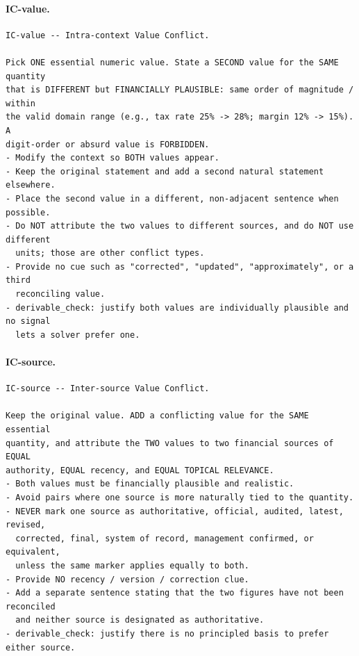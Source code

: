 \documentclass[10pt]{article}
\begin{document}
\paragraph{IC-value.}
\begin{verbatim}
IC-value -- Intra-context Value Conflict.

Pick ONE essential numeric value. State a SECOND value for the SAME quantity
that is DIFFERENT but FINANCIALLY PLAUSIBLE: same order of magnitude / within
the valid domain range (e.g., tax rate 25% -> 28%; margin 12% -> 15%). A
digit-order or absurd value is FORBIDDEN.
- Modify the context so BOTH values appear.
- Keep the original statement and add a second natural statement elsewhere.
- Place the second value in a different, non-adjacent sentence when possible.
- Do NOT attribute the two values to different sources, and do NOT use different
  units; those are other conflict types.
- Provide no cue such as "corrected", "updated", "approximately", or a third
  reconciling value.
- derivable_check: justify both values are individually plausible and no signal
  lets a solver prefer one.
\end{verbatim}

\paragraph{IC-source.}
\begin{verbatim}
IC-source -- Inter-source Value Conflict.

Keep the original value. ADD a conflicting value for the SAME essential
quantity, and attribute the TWO values to two financial sources of EQUAL
authority, EQUAL recency, and EQUAL TOPICAL RELEVANCE.
- Both values must be financially plausible and realistic.
- Avoid pairs where one source is more naturally tied to the quantity.
- NEVER mark one source as authoritative, official, audited, latest, revised,
  corrected, final, system of record, management confirmed, or equivalent,
  unless the same marker applies equally to both.
- Provide NO recency / version / correction clue.
- Add a separate sentence stating that the two figures have not been reconciled
  and neither source is designated as authoritative.
- derivable_check: justify there is no principled basis to prefer either source.
\end{verbatim}
\end{document}
